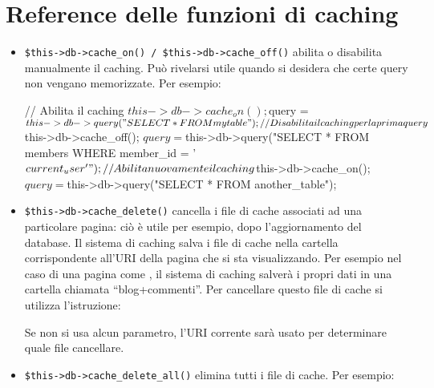 \section*{Reference delle funzioni di caching}
\begin{itemize}
\item \verb|$this->db->cache_on() / $this->db->cache_off()| abilita o disabilita manualmente il caching. Può rivelarsi utile quando si desidera che certe query non vengano memorizzate. Per esempio: 

\begin{code}
// Abilita il caching
$this->db->cache_on();
$query = $this->db->query("SELECT * FROM mytable");

// Disabilita il caching per la prima query
$this->db->cache_off();
$query = $this->db->query("SELECT * FROM members WHERE member_id = '$current_user'");

// Abilita nuovamente il caching
$this->db->cache_on();
$query = $this->db->query("SELECT * FROM another_table");
\end{code}

\item \verb|$this->db->cache_delete()| cancella i file di cache associati ad una particolare pagina: ciò è utile per esempio, dopo l'aggiornamento del database. Il sistema di caching salva i file di cache nella cartella corrispondente all'\ac{URI} della pagina che si sta visualizzando. Per esempio nel caso di una pagina come , il sistema di caching salverà i propri dati in una cartella chiamata ``blog+commenti''. Per cancellare questo file di cache si utilizza l'istruzione:


Se non si usa alcun parametro, l'\ac{URI} corrente sarà usato per determinare quale file cancellare.

\item \verb|$this->db->cache_delete_all()| elimina tutti i file di cache. Per esempio:

\end{itemize}
